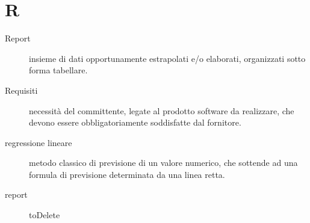 \documentclass{article}
\begin{document}
	\section{R}
	\begin{description}
		\item[Report] insieme di dati opportunamente estrapolati e/o elaborati, organizzati sotto forma tabellare.
		\item[Requisiti] necessità del committente, legate al prodotto software da realizzare, che devono essere obbligatoriamente soddisfatte dal fornitore.
		\item[regressione lineare] metodo classico di previsione di un valore numerico, che sottende ad una formula di previsione determinata da una linea retta.
		\item[report] toDelete
	\end{description}
\end{document}

